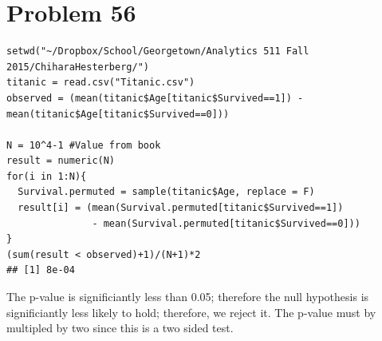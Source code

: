 \documentclass{article}\usepackage[]{graphicx}\usepackage[]{color}
\makeatletter
\newenvironment{kframe}{%
 \def\at@end@of@kframe{}%
 \ifinner\ifhmode%
  \def\at@end@of@kframe{\end{minipage}}%
  \begin{minipage}{\columnwidth}%
 \fi\fi%
 \def\FrameCommand##1{\hskip\@totalleftmargin \hskip-\fboxsep
 \colorbox{shadecolor}{##1}\hskip-\fboxsep
     \hskip-\linewidth \hskip-\@totalleftmargin \hskip\columnwidth}%
 \MakeFramed {\advance\hsize-\width
   \@totalleftmargin\z@ \linewidth\hsize
   \@setminipage}}%
 {\par\unskip\endMakeFramed%
 \at@end@of@kframe}
\newenvironment{knitrout}{}{} %
\makeatother
\begin{document}
\section*{Problem 56}
\begin{knitrout}
\color{fgcolor}\begin{kframe}
\begin{verbatim}
setwd("~/Dropbox/School/Georgetown/Analytics 511 Fall 2015/ChiharaHesterberg/")
titanic = read.csv("Titanic.csv")
observed = (mean(titanic$Age[titanic$Survived==1]) - mean(titanic$Age[titanic$Survived==0]))

N = 10^4-1 #Value from book
result = numeric(N)
for(i in 1:N){
  Survival.permuted = sample(titanic$Age, replace = F)
  result[i] = (mean(Survival.permuted[titanic$Survived==1]) 
               - mean(Survival.permuted[titanic$Survived==0]))
}
(sum(result < observed)+1)/(N+1)*2
## [1] 8e-04
\end{verbatim}
\end{kframe}
\end{knitrout}
The p-value is significiantly less than 0.05; therefore the null hypothesis is significiantly less likely to hold; therefore, we reject it. The p-value must by multipled by two since this is a two sided test.
\end{document}
